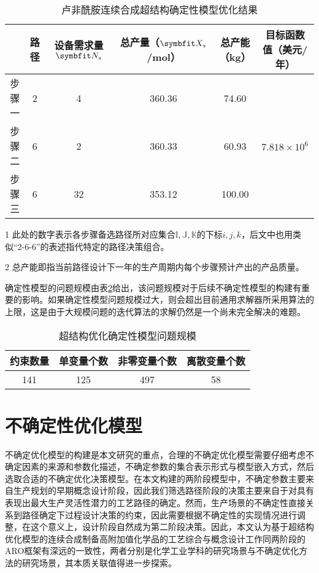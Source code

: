 \begin{table}[ht!]
  \centering
  \begin{threeparttable}[c]
    \caption{卢非酰胺连续合成超结构确定性模型优化结果}
    \label{tab:deterministic}
    \begin{tabular}{cccccc}
      \toprule
       & 路径\tnote{1} & 设备需求量$\symbfit N_s$ & 总产量（$\symbfit X_s$/mol） & 总产能\tnote{2}（kg）& 目标函数值（美元/年） \\
      \midrule
      步骤一 & 2   &  4   &  360.36	 &  74.60   &  \multirow[c]{3}{*}{$7.818\times 10^6$} \\
      步骤二 & 6   &  2   &  360.33	 &  60.93   & \\
      步骤三 & 6   &  32  &  353.12	 &  100.00  & \\
      \bottomrule
    \end{tabular}
    \begin{tablenotes}
      \item [1] 此处的数字表示各步骤备选路径所对应集合$\mathbb{I,J,K}$的下标$i,j,k$，后文中也用类似“2-6-6”的表述指代特定的路径决策组合。
      \item [2] 总产能即指当前路径设计下一年的生产周期内每个步骤预计产出的产品质量。
    \end{tablenotes}
  \end{threeparttable}
\end{table}

确定性模型的问题规模由表\ref{tab:problemscale}给出，该问题规模对于后续不确定性模型的构建有重要的影响。如果确定性模型问题规模过大，则会超出目前通用求解器所采用算法的上限，这是由于大规模问题的迭代算法的求解仍然是一个尚未完全解决的难题。

\begin{table}[ht!]
  \centering
  \caption{超结构优化确定性模型问题规模}
  \begin{tabular}{cccc}
    \toprule
    约束数量         & 单变量个数   &  非零变量个数   &  离散变量个数  \\
    \midrule
    141   & 125  &   497  &   58 \\
    \bottomrule
  \end{tabular}
  \label{tab:problemscale}
\end{table}

\section{不确定性优化模型}

不确定优化模型的构建是本文研究的重点，合理的不确定优化模型需要仔细考虑不确定因素的来源和参数化描述，不确定参数的集合表示形式与模型嵌入方式，然后选取合适的不确定优化决策模型。在本文构建的两阶段模型中，不确定参数主要来自生产规划的早期概念设计阶段，因此我们筛选路径阶段的决策主要来自于对具有表现出最大生产灵活性潜力的工艺路径的确定。然而，生产场景的不确定性直接关系到路径确定下过程设计决策的约束，因此需要根据不确定性的实现情况进行调整，在这个意义上，设计阶段自然成为第二阶段决策。因此，本文认为基于超结构优化模型的连续合成制备高附加值化学品的工艺综合与概念设计工作同两阶段的ARO框架有深远的一致性，两者分别是化学工业学科的研究场景与不确定优化方法的研究场景，其本质关联值得进一步探索。

